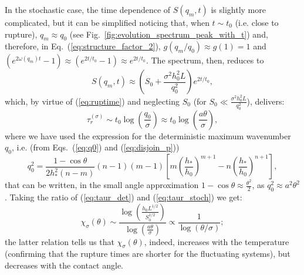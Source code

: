 {\begin{equation}
\end{equation}
In the stochastic case, the time dependence of $S(q_m,t)$ is slightly more complicated, but it can be simplified noticing that, 
when $t \sim t_0$ (i.e. close to rupture), $q_m \approx q_0$ (see Fig.~\ref{fig:evolution_spectrum_peak_with_t}) and, therefore, 
in Eq.~(\ref{eq:structure_factor_2}), $g(q_m/q_0) \approx g(1) = 1$ and $(e^{2\omega(q_m)t}-1) \approx (e^{2t/t_0}-1) \approx e^{2t/t_0}$.
The spectrum, then, reduces to 
$$
S(q_m,t) \approx \left(S_0 + \frac{\sigma^2 h_0^2 L}{q_0^2}\right)e^{2t/t_0},
$$
which, by virtue of (\ref{eq:ruptime}) and neglecting $S_0$ (for $S_0 \ll \frac{\sigma^2 h_0^2 L}{q_0^2}$), delivers:
\begin{equation}\label{eq:taur_stoch}
    \tau_r^{(\sigma)} \sim t_0 \log\left(\frac{q_0}{\sigma}\right) \approx t_0 \log \left( \frac{a \theta}{\sigma}\right),
\end{equation}
where we have used the expression for the deterministic maximum wavenumber $q_0$, i.e. (from Eqs.~(\ref{eq:q0}) and (\ref{eq:disjoin_p})) 
$$
q_0^2=\frac{1-\cos \theta}{2h_{\ast}^2(n-m)}(n-1)(m-1)\left[m\left(\frac{h_{\ast}}{h_0}\right)^{m+1} - n\left(\frac{h_{\ast}}{h_0}\right)^{n+1}\right],
$$ 
that can be written, in the small angle approximation $1-\cos \theta \approx \frac{\theta^2}{2}$, as $q_0^2 \approx a^2 \theta^2$.
Taking the ratio of (\ref{eq:taur_det}) and (\ref{eq:taur_stoch}) we get:
\begin{equation}\label{eq:chi}
    \chi_{\sigma}(\theta) \sim \frac{\log\left(\frac{h_0 L^{1/2}}{S_0^{1/2}}\right)}{\log\left(\frac{a \theta}{\sigma}\right)} \propto \frac{1}{\log(\theta/\sigma)};
\end{equation}
the latter relation tells us that $\chi_{\sigma}(\theta)$, indeed, increases with the temperature 
(confirming that the rupture times are shorter for the fluctuating systems), but decreases with the contact angle.}
